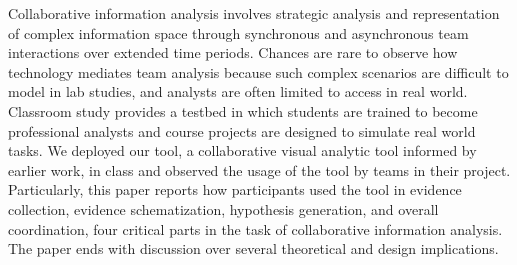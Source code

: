 
Collaborative information analysis involves strategic analysis and representation of complex information space through synchronous and asynchronous team interactions over extended time periods. Chances are rare to observe how technology mediates team analysis because such complex scenarios are difficult to model in lab studies, and analysts are often limited to access in real world. Classroom study provides a testbed in which students are trained to become professional analysts and course projects are designed to simulate real world tasks. We deployed our tool, a collaborative visual analytic tool informed by earlier work, in class and observed the usage of the tool by teams in their project. Particularly, this paper reports how participants used the tool in evidence collection, evidence schematization, hypothesis generation, and overall coordination, four critical parts in the task of collaborative information analysis. The paper ends with discussion over several theoretical and design implications.
%
